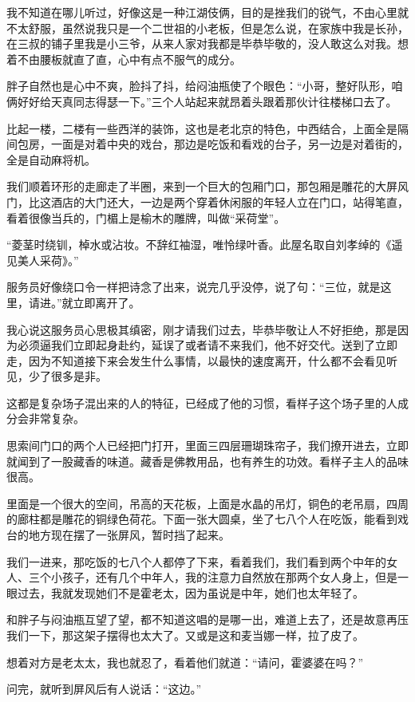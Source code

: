 我不知道在哪儿听过，好像这是一种江湖伎俩，目的是挫我们的锐气，不由心里就不太舒服，虽然说我只是一个二世祖的小老板，但是怎么说，在家族中我是长孙，在三叔的铺子里我是小三爷，从来人家对我都是毕恭毕敬的，没人敢这么对我。想着不由腰板就直了直，心中有点不服气的成分。

胖子自然也是心中不爽，脸抖了抖，给闷油瓶使了个眼色：“小哥，整好队形，咱俩好好给天真同志得瑟一下。”三个人站起来就昂着头跟着那伙计往楼梯口去了。

比起一楼，二楼有一些西洋的装饰，这也是老北京的特色，中西结合，上面全是隔间包房，一面是对着中央的戏台，那边是吃饭和看戏的台子，另一边是对着街的，全是自动麻将机。

我们顺着环形的走廊走了半圈，来到一个巨大的包厢门口，那包厢是雕花的大屏风门，比这酒店的大门还大，一边是两个穿着休闲服的年轻人立在门口，站得笔直，看着很像当兵的，门楣上是榆木的雕牌，叫做“采荷堂”。

“菱茎时绕钏，棹水或沾妆。不辞红袖湿，唯怜绿叶香。此屋名取自刘孝绰的《遥见美人采荷》。”

服务员好像绕口令一样把诗念了出来，说完几乎没停，说了句：“三位，就是这里，请进。”就立即离开了。

我心说这服务员心思极其缜密，刚才请我们过去，毕恭毕敬让人不好拒绝，那是因为必须逼我们立即起身赴约，延误了或者请不来我们，他不好交代。送到了立即走，因为不知道接下来会发生什么事情，以最快的速度离开，什么都不会看见听见，少了很多是非。

这都是复杂场子混出来的人的特征，已经成了他的习惯，看样子这个场子里的人成分会非常复杂。

思索间门口的两个人已经把门打开，里面三四层珊瑚珠帘子，我们撩开进去，立即就闻到了一股藏香的味道。藏香是佛教用品，也有养生的功效。看样子主人的品味很高。

里面是一个很大的空间，吊高的天花板，上面是水晶的吊灯，铜色的老吊扇，四周的廊柱都是雕花的铜绿色荷花。下面一张大圆桌，坐了七八个人在吃饭，能看到戏台的地方现在摆了一张屏风，暂时挡了起来。

我们一进来，那吃饭的七八个人都停了下来，看着我们，我们看到两个中年的女人、三个小孩子，还有几个中年人，我的注意力自然放在那两个女人身上，但是一眼过去，我就发现她们不是霍老太，因为虽说是中年，她们也太年轻了。

和胖子与闷油瓶互望了望，都不知道这唱的是哪一出，难道上去了，还是故意再压我们一下，那这架子摆得也太大了。又或是这和麦当娜一样，拉了皮了。

想着对方是老太太，我也就忍了，看着他们就道：“请问，霍婆婆在吗？”

问完，就听到屏风后有人说话：“这边。”

